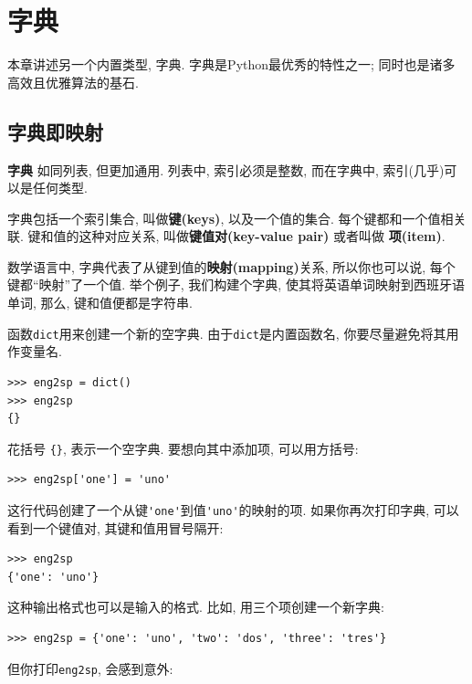 \documentclass[10pt]{book}
\begin{document}
\chapter{字典}

本章讲述另一个内置类型, 字典. 
字典是Python最优秀的特性之一; 同时也是诸多高效且优雅算法的基石. 


\section{字典即映射}


 {\bf 字典} 如同列表, 但更加通用. 列表中, 索引必须是整数, 
而在字典中, 索引(几乎)可以是任何类型. 

字典包括一个索引集合, 叫做{\bf 键(keys)}, 以及一个值的集合. 
每个键都和一个值相关联. 键和值的这种对应关系, 叫做{\bf 键值对(key-value pair)}
或者叫做 {\bf 项(item)}.  

数学语言中, 字典代表了从键到值的{\bf 映射(mapping)}关系, 
所以你也可以说, 每个键都``映射''了一个值. 
举个例子, 我们构建个字典, 使其将英语单词映射到西班牙语单词, 
那么, 键和值便都是字符串. 

函数{\tt dict}用来创建一个新的空字典. 
由于{\tt dict}是内置函数名, 你要尽量避免将其用作变量名. 

\begin{verbatim}
>>> eng2sp = dict()
>>> eng2sp
{}
\end{verbatim}

花括号 \verb"{}", 表示一个空字典. 
要想向其中添加项, 可以用方括号:

\begin{verbatim}
>>> eng2sp['one'] = 'uno'
\end{verbatim}
%
这行代码创建了一个从键\verb"'one'"到值\verb"'uno'"的映射的项. 
如果你再次打印字典, 可以看到一个键值对, 其键和值用冒号隔开:

\begin{verbatim}
>>> eng2sp
{'one': 'uno'}
\end{verbatim}
%

这种输出格式也可以是输入的格式. 比如, 用三个项创建一个新字典:

\begin{verbatim}
>>> eng2sp = {'one': 'uno', 'two': 'dos', 'three': 'tres'}
\end{verbatim}
%
但你打印{\tt eng2sp}, 会感到意外:
\end{document}
